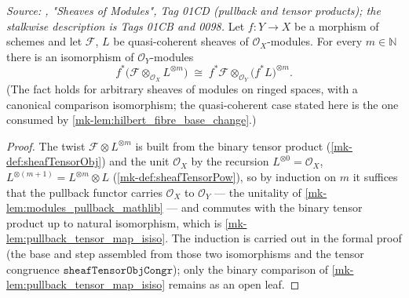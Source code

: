 \begin{lemma}\label{mk-lem:pullback_moduleTensorPow}
  \leanok

  \textit{Source: \cite{stacks-project}, "Sheaves of Modules", Tag 01CD (pullback
  and tensor products); the stalkwise description is Tags 01CB and 0098.}
  Let \(f : Y \to X\) be a morphism of schemes and let \(\mathcal{F}\), \(L\)
  be quasi-coherent sheaves of \(\mathcal{O}_X\)-modules.  For every
  \(m \in \mathbb{N}\) there is an isomorphism of \(\mathcal{O}_Y\)-modules
  \[
    f^*\bigl(\mathcal{F} \otimes_{\mathcal{O}_X} L^{\otimes m}\bigr)
    \;\cong\;
    f^*\mathcal{F} \otimes_{\mathcal{O}_Y} \bigl(f^*L\bigr)^{\otimes m}.
  \]
  (The fact holds for arbitrary sheaves of modules on ringed spaces, with a
  canonical comparison isomorphism; the quasi-coherent case stated here is
  the one consumed by \ref{mk-lem:hilbert_fibre_base_change}.)
\end{lemma}
\begin{proof}
  The twist \(\mathcal{F} \otimes L^{\otimes m}\) is built from the binary
  tensor product (\ref{mk-def:sheafTensorObj}) and the unit
  \(\mathcal{O}_X\) by the recursion \(L^{\otimes 0} = \mathcal{O}_X\),
  \(L^{\otimes (m+1)} = L^{\otimes m} \otimes L\)
  (\ref{mk-def:sheafTensorPow}), so by induction on \(m\) it suffices that the
  pullback functor carries \(\mathcal{O}_X\) to \(\mathcal{O}_Y\) — the
  unitality of \ref{mk-lem:modules_pullback_mathlib} — and commutes with the
  binary tensor product up to natural isomorphism, which is
  \ref{mk-lem:pullback_tensor_map_isiso}.  The induction is carried out in the formal proof
  (the base and step assembled from those two isomorphisms and the tensor
  congruence \(\texttt{sheafTensorObjCongr}\)); only the binary comparison of
  \ref{mk-lem:pullback_tensor_map_isiso} remains as an open leaf.
\end{proof}

